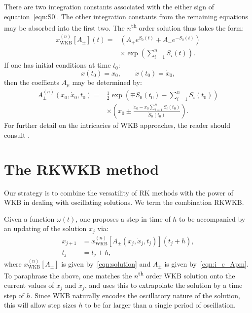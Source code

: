 There are two integration constants associated with the either sign of equation~\eqref{eqn:S0}. The other integration constants from the remaining equations may be absorbed into the first two. The $n$\textsuperscript{th} order solution thus takes the form:
\begin{align}
  x_\mathrm{WKB}^{(n)}[A_{\pm}](t) =&
  \left( A_{+} e^{S_0(t)} + A_{-} e^{-S_0(t)} \right)
  \nonumber\\
  &\times \exp\left( \sum_{i=1}^n S_i(t) \right).
  \label{eqn:solution}
\end{align}
If one has initial conditions at time $t_0$:
\begin{equation}
  x(t_0) = x_0, \qquad \dot{x}(t_0)=\dot{x}_0,
  \label{eqn:i_c}
\end{equation}
then the coeffients $A_\mu$ may be determined by:
\begin{align}
  A_\pm^{(n)}(x_0,\dot{x}_0,t_0) =& \frac{1}{2}\exp{\left( \mp S_0(t_0) - \sum_{i=1}^n S_i(t_0) \right)}
  \nonumber\\
  &\times\left( x_0 \pm  \frac{\dot{x}_0-x_0\sum_{i=1}^n \dot{S}_i(t_0)}{\dot{S}_0(t_0)}\right).
  \label{eqn:i_c_Apm}
\end{align}
For further detail on the intricacies of WKB approaches, the reader should consult \cite{RHB,Bender+2010}.

\section{The RKWKB method}
Our strategy is to combine the versatility of RK methods with the power of WKB in dealing with oscillating solutions. We term the combination RKWKB.

Given a function $\omega(t)$, one proposes a step in time of $h$ to be accompanied by an updating of the solution $x_j$ via:
\begin{align}
  x_{j+1} &= x_\mathrm{WKB}^{(n)}[A_\pm(x_j,\dot{x}_j,t_j)](t_j+h),
  \label{eqn:WKB_x_step} \\
  t_j &= t_j+h,
  \label{eqn:WKB_t_step}
\end{align}
where $x_\mathrm{WKB}^{(n)}[A_{\pm}]$ is given by~\eqref{eqn:solution} and $A_{\pm}$ is given by~\eqref{eqn:i_c_Apm}.
To paraphrase the above, one matches the $n$\textsuperscript{th} order WKB solution onto the current values of $x_j$ and $\dot{x}_j$, and uses this to extrapolate the solution by a time step of $h$. Since WKB naturally encodes the oscillatory nature of the solution, this will allow step sizes $h$ to be far larger than a single period of oscillation. 

